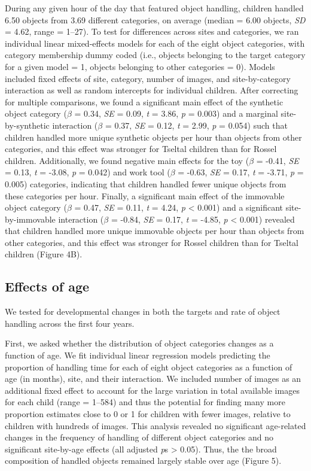 \documentclass[10pt, letterpaper]{article}
\begin{document}
During any given hour of the day that featured object handling, children
handled 6.50 objects from 3.69 different categories, on average (median
= 6.00 objects, \emph{SD} = 4.62, range = 1--27). To test for
differences across sites and categories, we ran individual linear
mixed-effects models for each of the eight object categories, with
category membership dummy coded (i.e., objects belonging to the target
category for a given model = 1, objects belonging to other categories =
0). Models included fixed effects of site, category, number of images,
and site-by-category interaction as well as random intercepts for
individual children. After correcting for multiple comparisons, we found
a significant main effect of the synthetic object category (\(\beta\) =
0.34, \emph{SE} = 0.09, \emph{t} = 3.86, \emph{p} = 0.003) and a
marginal site-by-synthetic interaction (\(\beta\) = 0.37, \emph{SE} =
0.12, \emph{t} = 2.99, \emph{p} = 0.054) such that children handled more
unique synthetic objects per hour than objects from other categories,
and this effect was stronger for Tseltal children than for Rossel
children. Additionally, we found negative main effects for the toy
(\(\beta\) = -0.41, \emph{SE} = 0.13, \emph{t} = -3.08, \emph{p} =
0.042) and work tool (\(\beta\) = -0.63, \emph{SE} = 0.17, \emph{t} =
-3.71, \emph{p} = 0.005) categories, indicating that children handled
fewer unique objects from these categories per hour. Finally, a
significant main effect of the immovable object category (\(\beta\) =
0.47, \emph{SE} = 0.11, \emph{t} = 4.24, \emph{p} \textless{} 0.001) and
a significant site-by-immovable interaction (\(\beta\) = -0.84,
\emph{SE} = 0.17, \emph{t} = -4.85, \emph{p} \textless{} 0.001) revealed
that children handled more unique immovable objects per hour than
objects from other categories, and this effect was stronger for Rossel
children than for Tseltal children (Figure 4B).

\hypertarget{effects-of-age}{%
\subsection{Effects of age}\label{effects-of-age}}

We tested for developmental changes in both the targets and rate of
object handling across the first four years.

First, we asked whether the distribution of object categories changes as
a function of age. We fit individual linear regression models predicting
the proportion of handling time for each of eight object categories as a
function of age (in months), site, and their interaction. We included
number of images as an additional fixed effect to account for the large
variation in total available images for each child (range = 1--584) and
thus the potential for finding many more proportion estimates close to 0
or 1 for children with fewer images, relative to children with hundreds
of images. This analysis revealed no significant age-related changes in
the frequency of handling of different object categories and no
significant site-by-age effects (all adjusted \emph{p}s \textgreater{}
0.05). Thus, the the broad composition of handled objects remained
largely stable over age (Figure 5).
\end{document}
